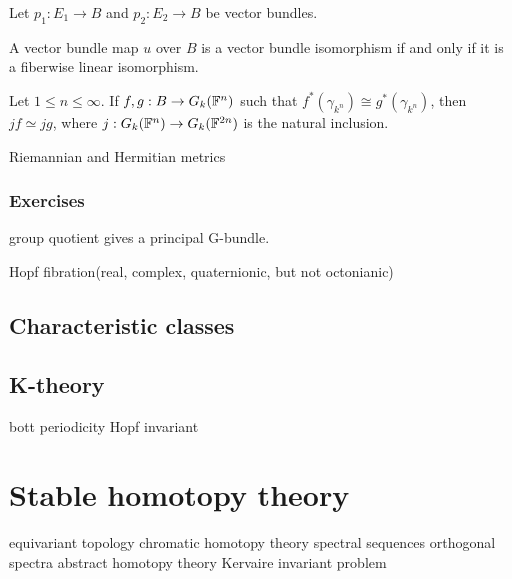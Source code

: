 \documentclass{../../large}
\begin{document}
\begin{prb}
Let $p_1:E_1\to B$ and $p_2:E_2\to B$ be vector bundles.
\begin{parts}
\item A vector bundle map $u$ over $B$ is a vector bundle isomorphism if and only if it is a fiberwise linear isomorphism.
\end{parts}
\end{prb}



Let $1\le n\le\infty$.
If $f,g:B\to G_k(\mathbb{F}^n)$ such that $f^*(\gamma_{k^n})\cong g^*(\gamma_{k^n})$, then $jf\simeq jg$, where $j:G_k(\mathbb{F}^n)\to G_k(\mathbb{F}^{2n})$ is the natural inclusion.


\begin{prb}
Riemannian and Hermitian metrics
\end{prb}

\section*{Exercises}

group quotient gives a principal G-bundle.

Hopf fibration(real, complex, quaternionic, but not octonianic)





\chapter{Characteristic classes}


\chapter{K-theory}

bott periodicity
Hopf invariant





\part{Stable homotopy theory}
equivariant topology
chromatic homotopy theory
spectral sequences
orthogonal spectra
abstract homotopy theory
Kervaire invariant problem
\end{document}
